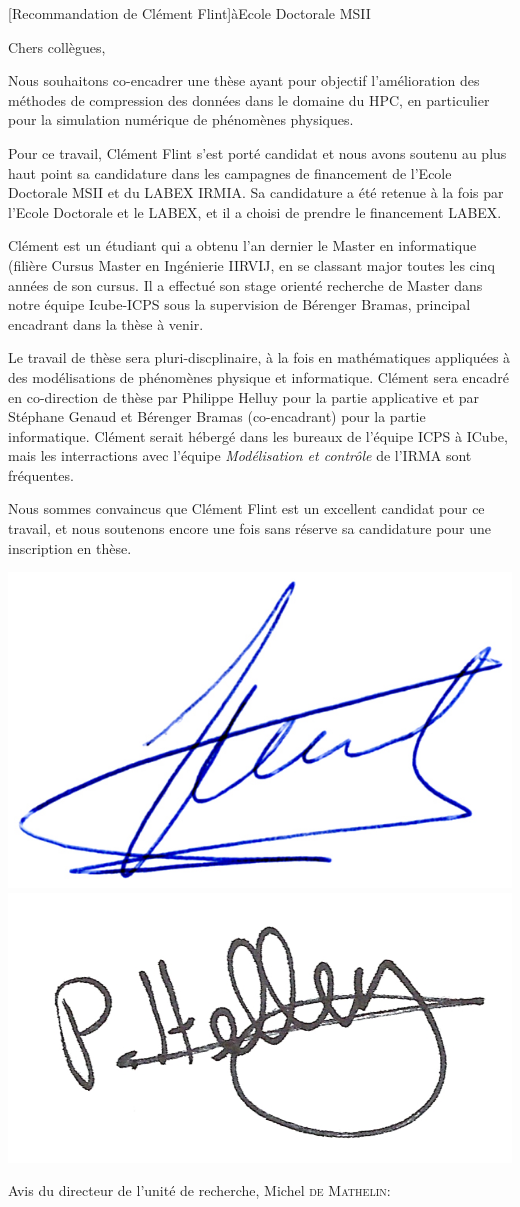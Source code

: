 \documentclass[a4paper,10pt]{article}
\begin{document}

\begin{letter}[Recommandation de Clément Flint]{à}{Ecole Doctorale MSII}

Chers collègues, 

  Nous souhaitons co-encadrer  une thèse ayant pour  objectif l'amélioration des
  méthodes de  compression des données  dans le  domaine du HPC,  en particulier
  pour la simulation numérique de phénomènes physiques.

Pour ce  travail, Clément Flint  s'est porté candidat  et nous avons  soutenu au
plus haut  point sa  candidature dans  les campagnes  de financement  de l'Ecole
Doctorale MSII et du LABEX  IRMIA. Sa candidature a été retenue à la fois par
l'Ecole Doctorale et le LABEX, et il a choisi de prendre le financement LABEX.

Clément est  un étudiant  qui a  obtenu l'an dernier  le Master  en informatique
(filière Cursus  Master en Ingénierie  IIRVIJ, en  se classant major  toutes les
cinq années de son cursus.  Il a  effectué son stage orienté recherche de Master
dans notre équipe  Icube-ICPS sous la supervision de  Bérenger Bramas, principal
encadrant dans la thèse à venir.

Le  travail  de  thèse  sera  pluri-discplinaire, à  la  fois  en  mathématiques
appliquées à des  modélisations de phénomènes physique  et informatique. Clément
sera  encadré en  co-direction  de  thèse par  Philippe  Helluy  pour la  partie
applicative et  par Stéphane  Genaud et Bérenger  Bramas (co-encadrant)  pour la
partie informatique. Clément serait hébergé dans  les bureaux de l'équipe ICPS à
ICube,  mais les  interractions avec  l'équipe \textit{Modélisation  et contrôle}
de l'IRMA sont fréquentes.


Nous sommes convaincus que Clément Flint est un excellent candidat pour ce
travail, et nous soutenons encore une fois sans réserve sa candidature pour une
inscription en thèse.

\begin{flushright}
\includegraphics[width=.25\textwidth]{signgenaud.jpg} 
\includegraphics[width=.25\textwidth]{sign_helluy.jpg} 
\end{flushright}

\end{letter}
\newpage
\noindent
Avis du directeur de l'unité de recherche, Michel \textsc{de Mathelin}:\\[3mm]

%
%
\end{document}
